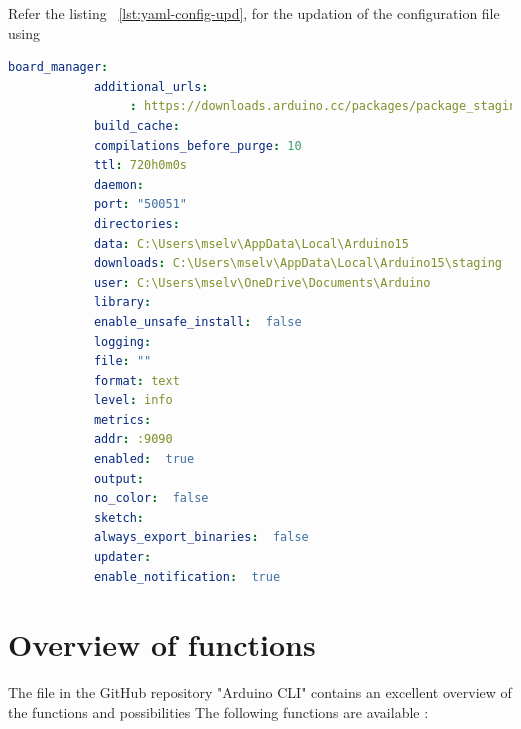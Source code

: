 Refer the listing ~\ref{lst:yaml-config-upd}, for the updation of the configuration file using 

\begin{code}
	\begin{center}
		\begin{lstlisting}[language=yaml,caption={Updated settings of the configuration file},label={lst:yaml-config-upd}]
			board_manager:
			additional_urls: 
			     : https://downloads.arduino.cc/packages/package_staging_index.json
			build_cache:
			compilations_before_purge: 10
			ttl: 720h0m0s
			daemon:
			port: "50051"
			directories:
			data: C:\Users\mselv\AppData\Local\Arduino15
			downloads: C:\Users\mselv\AppData\Local\Arduino15\staging
			user: C:\Users\mselv\OneDrive\Documents\Arduino
			library:
			enable_unsafe_install:  false
			logging:
			file: ""
			format: text
			level: info
			metrics:
			addr: :9090
			enabled:  true
			output:
			no_color:  false
			sketch:
			always_export_binaries:  false
			updater:
			enable_notification:  true
		\end{lstlisting}
	\end{center}
\end{code}

\section{Overview of functions}
The file  in the GitHub repository "Arduino CLI" contains an excellent overview of the functions and possibilities \cite{ArduinoCLIGit:2024}
The following functions are available \cite{ArduinoCLIversion:2024}:

